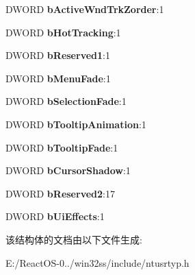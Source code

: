 \begin{DoxyCompactItemize}
D\+W\+O\+RD {\bfseries b\+Active\+Wnd\+Trk\+Zorder}\+:1
\item 
\mbox{\label{struct_u_s_e_r_p_r_e_f_e_r_e_n_c_e_s_m_a_s_k_a10422ebc15dad5522748979cbcd691f5}} 
D\+W\+O\+RD {\bfseries b\+Hot\+Tracking}\+:1
\item 
\mbox{\label{struct_u_s_e_r_p_r_e_f_e_r_e_n_c_e_s_m_a_s_k_a522e6bb641b9b2f136198eefc3cfd789}} 
D\+W\+O\+RD {\bfseries b\+Reserved1}\+:1
\item 
\mbox{\label{struct_u_s_e_r_p_r_e_f_e_r_e_n_c_e_s_m_a_s_k_afea17a796ceb704e13172a8b6966f89a}} 
D\+W\+O\+RD {\bfseries b\+Menu\+Fade}\+:1
\item 
\mbox{\label{struct_u_s_e_r_p_r_e_f_e_r_e_n_c_e_s_m_a_s_k_a35c642a388f43d9b256102cce8d06235}} 
D\+W\+O\+RD {\bfseries b\+Selection\+Fade}\+:1
\item 
\mbox{\label{struct_u_s_e_r_p_r_e_f_e_r_e_n_c_e_s_m_a_s_k_af90283de41c61643f217b185ab9ad598}} 
D\+W\+O\+RD {\bfseries b\+Tooltip\+Animation}\+:1
\item 
\mbox{\label{struct_u_s_e_r_p_r_e_f_e_r_e_n_c_e_s_m_a_s_k_a8678f45a6e3b0f6c2d75f3c8e108aeea}} 
D\+W\+O\+RD {\bfseries b\+Tooltip\+Fade}\+:1
\item 
\mbox{\label{struct_u_s_e_r_p_r_e_f_e_r_e_n_c_e_s_m_a_s_k_a3c9b71e378106f94137d976661c7febf}} 
D\+W\+O\+RD {\bfseries b\+Cursor\+Shadow}\+:1
\item 
\mbox{\label{struct_u_s_e_r_p_r_e_f_e_r_e_n_c_e_s_m_a_s_k_a53bea2c76d037541da4bb991b9eb8054}} 
D\+W\+O\+RD {\bfseries b\+Reserved2}\+:17
\item 
\mbox{\label{struct_u_s_e_r_p_r_e_f_e_r_e_n_c_e_s_m_a_s_k_a767006ca2f52ef62a45dd0be8ba04e03}} 
D\+W\+O\+RD {\bfseries b\+Ui\+Effects}\+:1
\end{DoxyCompactItemize}


该结构体的文档由以下文件生成\+:\begin{DoxyCompactItemize}
\item 
E\+:/\+React\+O\+S-\/0../win32ss/include/ntusrtyp.\+h\end{DoxyCompactItemize}

